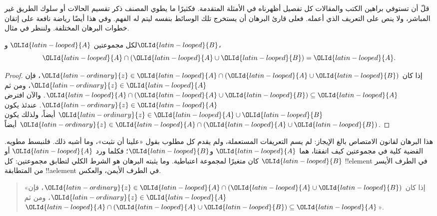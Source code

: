\documentclass[../../../include/open-logic-section]{subfiles}
\begin{document}

قلّ أن تستوفي براهين الكتب والمقالات كل تفصيل أظهرناه في الأمثلة
المتقدمة. فكثيرًا ما يطوي المصنف ذكر تقسيم الحالات أو سلوك الطريق
غير المباشر، ولا ينص على التعريف الذي أعمله. فعلى قارئ البرهان أن
يستخرج تلك الوسائط بنفسه ليتم له الفهم. وفي هذا أيضًا رياضة نافعة على
إتقان خطوات البرهان المختلفة. ولننظر في مثال.

\begin{prop}[الامتصاص]
لكل مجموعتين ${\OLId{latin-looped}{A}}$ و${\OLId{latin-looped}{B}}$،
\[
{\OLId{latin-looped}{A}} \cap ({\OLId{latin-looped}{A}} \cup {\OLId{latin-looped}{B}}) = {\OLId{latin-looped}{A}}.
\]
\end{prop}

\begin{proof}
إذا كان ${\OLId{latin-ordinary}{z}} \in {\OLId{latin-looped}{A}} \cap ({\OLId{latin-looped}{A}} \cup {\OLId{latin-looped}{B}})$، فإن ${\OLId{latin-ordinary}{z}} \in {\OLId{latin-looped}{A}}$، ومن ثم
${\OLId{latin-looped}{A}} \cap ({\OLId{latin-looped}{A}} \cup {\OLId{latin-looped}{B}}) \subseteq {\OLId{latin-looped}{A}}$. والآن افترض ${\OLId{latin-ordinary}{z}} \in {\OLId{latin-looped}{A}}$. عندئذ يكون
${\OLId{latin-ordinary}{z}} \in {\OLId{latin-looped}{A}} \cup {\OLId{latin-looped}{B}}$ أيضاً، ولذلك يكون ${\OLId{latin-ordinary}{z}} \in {\OLId{latin-looped}{A}} \cap ({\OLId{latin-looped}{A}} \cup {\OLId{latin-looped}{B}})$ أيضاً.
\end{proof}

هذا البرهان لقانون الامتصاص بالغ الإيجاز: لم يسم التعريفات المستعملة،
ولم يقدم كل مطلوب بقول «علينا أن نثبت»، وما أشبه ذلك. فلنبسط مطويه.
القضية كلية في مجموعتين كيف اتفقتا، هما ${\OLId{latin-looped}{A}}$ و${\OLId{latin-looped}{B}}$؛ فكلما ورد ${\OLId{latin-looped}{A}}$ أو
${\OLId{latin-looped}{B}}$ كان متغيرًا لمجموعة اعتباطية. وما يثبته البرهان هو الشرط الكلي
لتطابق مجموعتين: كل !!{element} في الطرف الأيسر من المتطابقة
!!a{element} في الطرف الأيمن، والعكس.

\begin{quote}
«إذا كان ${\OLId{latin-ordinary}{z}} \in {\OLId{latin-looped}{A}} \cap ({\OLId{latin-looped}{A}} \cup {\OLId{latin-looped}{B}})$، فإن ${\OLId{latin-ordinary}{z}} \in {\OLId{latin-looped}{A}}$، ومن ثم
${\OLId{latin-looped}{A}} \cap ({\OLId{latin-looped}{A}} \cup {\OLId{latin-looped}{B}}) \subseteq {\OLId{latin-looped}{A}}$».
\end{quote}
\end{document}
